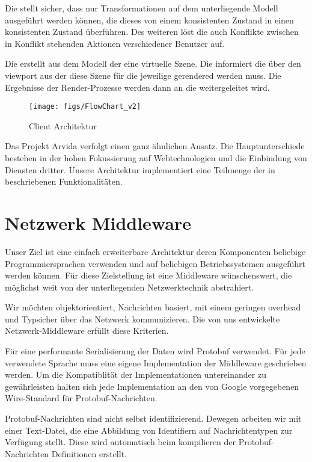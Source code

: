 Die \constructionLogic stellt sicher, dass nur Transformationen auf dem
unterliegende Modell ausgeführt werden können, die dieses von einem konsistenten
Zustand in einen konsistenten Zustand überführen. Des weiteren löst die
\constructionLogic auch Konflikte zwischen in Konflikt stehenden Aktionen
verschiedener Benutzer auf.

Die \visualization erstellt aus dem Modell der \constructionLogic eine virtuelle
Szene. Die \mobileDeviceComponent informiert die \visualization über den
viewport aus der diese Szene für die jeweilige \mobileDevice gerendered werden
muss. Die Ergebnisse der Render-Prozesse werden dann an die
\mobileDeviceComponent weitergeleitet wird.

\begin{figure}[H]
	\texttt{[image: figs/FlowChart\_v2]}
	\caption{Client Architektur}
	\label{fig:flowchart}
\end{figure}

Das Projekt Arvida \cite{Arvida2015} verfolgt einen ganz ähnlichen Ansatz. Die
Hauptunterschiede bestehen in der hohen Fokussierung auf Webtechnologien und die
Einbindung von Diensten dritter. Unsere Architektur implementiert eine Teilmenge
der in \cite{Arvida2015} beschriebenen Funktionalitäten. 

\section{Netzwerk Middleware}
\label{sec:middleware}
Unser Ziel ist eine einfach erweiterbare Architektur deren Komponenten beliebige
Programmiersprachen verwenden und auf beliebigen Betriebssystemen ausgeführt
werden können. Für diese Zielstellung ist eine Middleware wünschenswert, die
möglichst weit von der unterliegenden Netzwerktechnik abstrahiert.

Wir möchten objektorientiert, Nachrichten basiert, mit einem geringen overhead
und Typsicher über das Netzwerk kommunizieren. Die von uns entwickelte
Netzwerk-Middleware erfüllt diese Kriterien.

Für eine performante Serialisierung der Daten wird Protobuf verwendet. Für jede
verwendete Sprache muss eine eigene Implementation der Middleware
geschrieben werden. Um die Kompatiblität der Implementationen untereinander zu
gewährleisten halten sich jede Implementation
an den von Google vorgegebenen Wire-Standard für Protobuf-Nachrichten.

Protobuf-Nachrichten sind nicht selbst identifizierend. Dewegen arbeiten wir mit
einer Text-Datei, die eine Abbildung von Identifiern auf Nachrichtentypen zur
Verfügung stellt. Diese wird automatisch beim kompilieren der
Protobuf-Nachrichten Definitionen erstellt.


